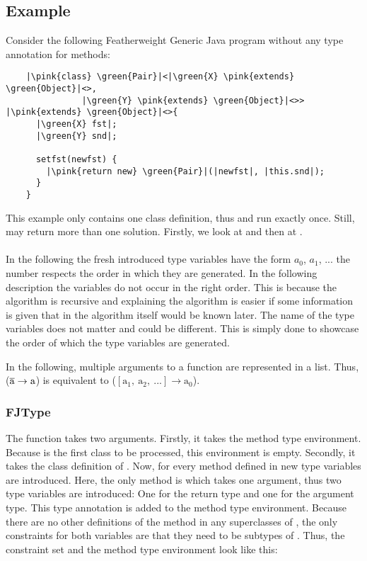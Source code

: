 \subsection{Example}

Consider the following Featherweight Generic Java program without any type annotation for methods:

\begin{verbatim}
    |\pink{class} \green{Pair}|<|\green{X} \pink{extends} \green{Object}|<>,
               |\green{Y} \pink{extends} \green{Object}|<>> |\pink{extends} \green{Object}|<>{
      |\green{X} fst|;
      |\green{Y} snd|;

      setfst(newfst) {
        |\pink{return new} \green{Pair}|(|newfst|, |this.snd|);
      }
    }
\end{verbatim}

This example only contains one class definition, thus  and  run exactly once. Still,  may return more than one solution.
Firstly, we look at  and then at .
\\
\\
In the following the fresh introduced type variables have the form $a_0$, $a_1$, ... the number respects the order in which they are generated. In the following description the variables do not occur in the right order. This is because the algorithm is recursive and explaining the algorithm is easier
if some information is given that in the algorithm itself would be known later. The name of the type variables does not matter and could be different. This is simply done to showcase the order of which the type variables are generated.

In the following, multiple arguments to a function are represented in a list. Thus, ($\overline{\text{a}} \to \text{a}$) is equivalent to ($[\text{a}_1, \ \text{a}_2, \ ...] \to \text{a}_0$).

\subsubsection{FJType}
The function  takes two arguments. Firstly, it takes the method type environment. Because  is the first class to be processed, this environment is empty. Secondly, it takes the class definition of .
Now, for every method defined in  new type variables are introduced. Here, the only method is  which takes one argument, thus two type variables are introduced: One for the return type and one for the argument type. This type annotation is added to the method type environment.
Because there are no other definitions of the method  in any superclasses of , the only constraints for both variables are that they need to be subtypes of . Thus, the constraint set and the method type environment look like this:

